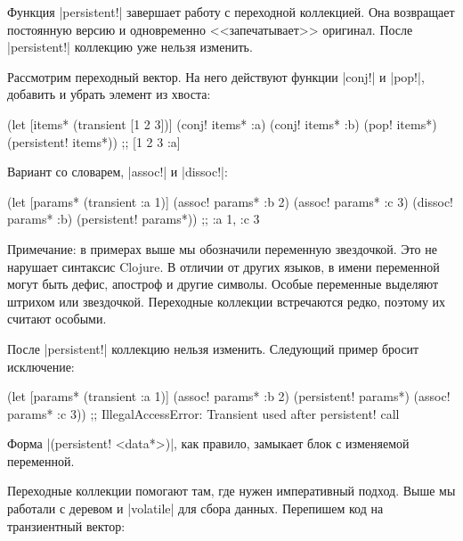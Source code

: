 Функция \spverb|persistent!| завершает работу с переходной коллекцией. Она
возвращает постоянную версию и одновременно <<запечатывает>> оригинал. После
\spverb|persistent!| коллекцию уже нельзя изменить.

Рассмотрим переходный вектор. На него действуют функции \spverb|conj!| и
\spverb|pop!|, добавить и убрать элемент из хвоста:

\begin{english}
  \begin{clojure}
(let [items* (transient [1 2 3])]
  (conj! items* :a)
  (conj! items* :b)
  (pop! items*)
  (persistent! items*))
;; [1 2 3 :a]
  \end{clojure}
\end{english}


\noindent
Вариант со словарем, \spverb|assoc!| и \spverb|dissoc!|:

\begin{english}
  \begin{clojure}
(let [params* (transient {:a 1})]
  (assoc! params* :b 2)
  (assoc! params* :c 3)
  (dissoc! params* :b)
  (persistent! params*))
;; {:a 1, :c 3}
  \end{clojure}
\end{english}

Примечание: в примерах выше мы обозначили переменную звездочкой. Это не нарушает
синтаксис Clojure. В отличии от других языков, в имени переменной могут быть
дефис, апостроф и другие символы. Особые переменные выделяют штрихом или
звездочкой. Переходные коллекции встречаются редко, поэтому их считают особыми.

После \spverb|persistent!| коллекцию нельзя изменить. Следующий пример бросит
исключение:

\begin{english}
  \begin{clojure}
(let [params* (transient {:a 1})]
  (assoc! params* :b 2)
  (persistent! params*)
  (assoc! params* :c 3))
;; IllegalAccessError: Transient used after persistent! call
  \end{clojure}
\end{english}

Форма \spverb|(persistent! <data*>)|, как правило, замыкает блок с изменяемой
переменной.

Переходные коллекции помогают там, где нужен императивный подход. Выше мы
работали с деревом и \spverb|volatile| для сбора данных. Перепишем код на
транзиентный вектор:


